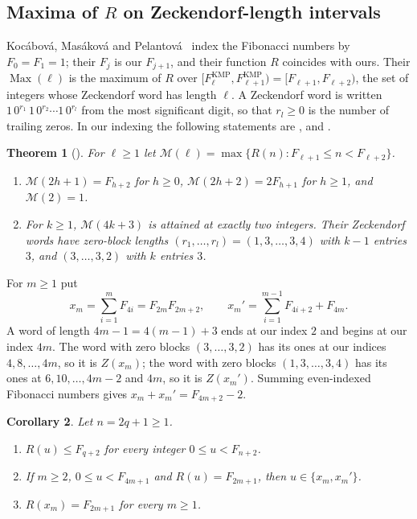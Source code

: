 \documentclass[11pt]{amsart}
\newtheorem{theorem}{Theorem}[section]
\newtheorem{corollary}[theorem]{Corollary}
\theoremstyle{definition}
\theoremstyle{remark}
\numberwithin{equation}{section}
\begin{document}
\subsection{\texorpdfstring{Maxima of $R$ on Zeckendorf-length intervals}{Maxima of R on Zeckendorf-length intervals}}
Koc\'abov\'a, Mas\'akov\'a and Pelantov\'a~\cite{KMP2005} index the Fibonacci numbers by
$F_0=F_1=1$; their $F_j$ is our $F_{j+1}$, and their function $R$ coincides with ours. Their
$\operatorname{Max}(\ell)$ is the maximum of $R$ over $[F^{\mathrm{KMP}}_\ell,F^{\mathrm{KMP}}_{\ell+1})
=[F_{\ell+1},F_{\ell+2})$, the set of integers whose Zeckendorf word has length $\ell$. A Zeckendorf
word is written $1\,0^{r_1}\,1\,0^{r_2}\cdots 1\,0^{r_l}$ from the most significant digit, so that
$r_l\ge0$ is the number of trailing zeros. In our indexing the following statements are
\cite[Theorem~4.7]{KMP2005}, \cite[Lemma~3.1(2)]{KMP2005} and \cite[Corollary~5.1(i)]{KMP2005}.

\begin{theorem}[\cite{KMP2005}]\label{thm:kmp}
For $\ell\ge1$ let $\mathcal M(\ell)=\max\{R(n):F_{\ell+1}\le n<F_{\ell+2}\}$.
\begin{enumerate}
\item[(a)] $\mathcal M(2h+1)=F_{h+2}$ for $h\ge0$, $\mathcal M(2h+2)=2F_{h+1}$ for $h\ge1$, and
$\mathcal M(2)=1$.
\item[(b)] For $k\ge1$, $\mathcal M(4k+3)$ is attained at exactly two integers. Their Zeckendorf
words have zero-block lengths $(r_1,\dots,r_l)=(1,3,\dots,3,4)$ with $k-1$ entries $3$, and
$(3,\dots,3,2)$ with $k$ entries $3$.
\end{enumerate}
\end{theorem}

For $m\ge1$ put
\[
  x_m=\sum_{i=1}^{m}F_{4i}=F_{2m}F_{2m+2},\qquad
  x_m'=\sum_{i=1}^{m-1}F_{4i+2}+F_{4m}.
\]
A word of length $4m-1=4(m-1)+3$ ends at our index $2$ and begins at our index $4m$. The word with
zero blocks $(3,\dots,3,2)$ has its ones at our indices $4,8,\dots,4m$, so it is $Z(x_m)$; the word
with zero blocks $(1,3,\dots,3,4)$ has its ones at $6,10,\dots,4m-2$ and $4m$, so it is $Z(x_m')$.
Summing even-indexed Fibonacci numbers gives $x_m+x_m'=F_{4m+2}-2$.

\begin{corollary}\label{cor:kmp}
Let $n=2q+1\ge1$.
\begin{enumerate}
\item[(a)] $R(u)\le F_{q+2}$ for every integer $0\le u<F_{n+2}$.
\item[(b)] If $m\ge2$, $0\le u<F_{4m+1}$ and $R(u)=F_{2m+1}$, then $u\in\{x_m,x_m'\}$.
\item[(c)] $R(x_m)=F_{2m+1}$ for every $m\ge1$.
\end{enumerate}
\end{corollary}
\end{document}
